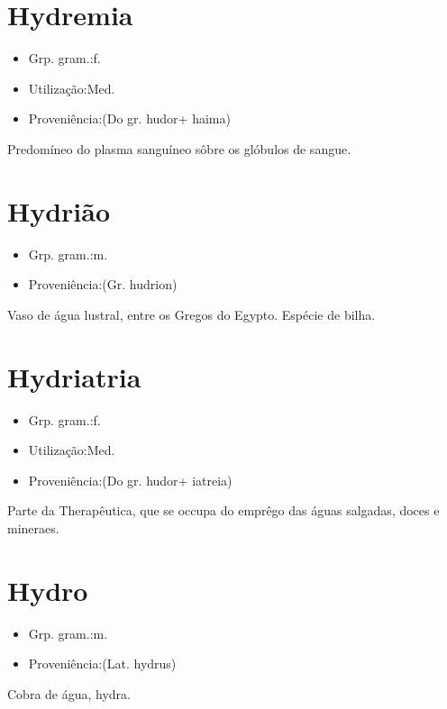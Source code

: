 \documentclass{article}
\begin{document}
\section{Hydremia}
\begin{itemize}
\item {Grp. gram.:f.}
\end{itemize}
\begin{itemize}
\item {Utilização:Med.}
\end{itemize}
\begin{itemize}
\item {Proveniência:(Do gr. \textunderscore hudor\textunderscore  + \textunderscore haima\textunderscore )}
\end{itemize}
Predomíneo do plasma sanguíneo sôbre os glóbulos de sangue.
\section{Hydrião}
\begin{itemize}
\item {Grp. gram.:m.}
\end{itemize}
\begin{itemize}
\item {Proveniência:(Gr. \textunderscore hudrion\textunderscore )}
\end{itemize}
Vaso de água lustral, entre os Gregos do Egypto.
Espécie de bilha.
\section{Hydriatria}
\begin{itemize}
\item {Grp. gram.:f.}
\end{itemize}
\begin{itemize}
\item {Utilização:Med.}
\end{itemize}
\begin{itemize}
\item {Proveniência:(Do gr. \textunderscore hudor\textunderscore  + \textunderscore iatreia\textunderscore )}
\end{itemize}
Parte da Therapêutica, que se occupa do emprêgo das águas salgadas, doces e mineraes.
\section{Hydro}
\begin{itemize}
\item {Grp. gram.:m.}
\end{itemize}
\begin{itemize}
\item {Proveniência:(Lat. \textunderscore hydrus\textunderscore )}
\end{itemize}
Cobra de água, hydra.
\end{document}
